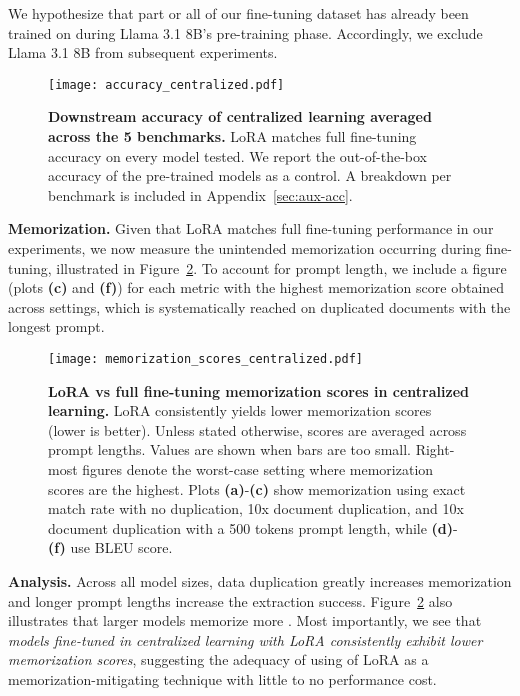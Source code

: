 We hypothesize that part or all of our fine-tuning dataset has already been trained on during Llama 3.1 8B's pre-training phase. Accordingly, we exclude Llama 3.1 8B from subsequent experiments.

\begin{figure}[ht]
\begin{center}
\centerline{\texttt{[image: accuracy\_centralized.pdf]}}
\caption{\textbf{Downstream accuracy of centralized learning averaged across the 5 benchmarks.} LoRA matches full fine-tuning accuracy on every model tested. We report the out-of-the-box accuracy of the pre-trained models as a control. A breakdown per benchmark is included in Appendix~\ref{sec:aux-acc}.}
\label{fig-cl-accuracy}
\vskip -0.2in
\end{center}
\end{figure}

\textbf{Memorization.} Given that LoRA matches full fine-tuning performance in our experiments, we now measure the unintended memorization occurring during fine-tuning, illustrated in Figure~\ref{fig-cl-privacy}. To account for prompt length, we include a figure (plots \textbf{(c)} and \textbf{(f)}) for each metric with the highest memorization score obtained across settings, which is systematically reached on duplicated documents with the longest prompt.

\begin{figure}[!htbp]
\vskip 0.2in
\begin{center}
\centerline{\texttt{[image: memorization\_scores\_centralized.pdf]}}
\caption{\textbf{LoRA vs full fine-tuning memorization scores in centralized learning.} LoRA consistently yields lower memorization scores (lower is better). Unless stated otherwise, scores are averaged across prompt lengths. Values are shown when bars are too small. Right-most figures denote the worst-case setting where memorization scores are the highest. Plots \textbf{(a)}-\textbf{(c)} show memorization using exact match rate with no duplication, 10x document duplication, and 10x document duplication with a 500 tokens prompt length, while \textbf{(d)}-\textbf{(f)} use BLEU score.}
\label{fig-cl-privacy}
\end{center}
\vskip -0.2in
\end{figure}

\textbf{Analysis.} Across all model sizes, data duplication greatly increases memorization and longer prompt lengths increase the extraction success. Figure~\ref{fig-cl-privacy} also illustrates that larger models memorize more \citep{memo, tirumala2022memorization}. Most importantly, we see that \textit{models fine-tuned in centralized learning with LoRA consistently exhibit lower memorization scores}, suggesting the adequacy of using of LoRA as a memorization-mitigating technique with little to no performance cost.

